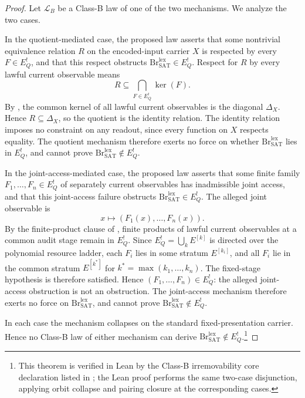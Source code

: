 \documentclass[11pt]{article}
\newcommand{\EQbang}{E^{!}_{Q}}
\theoremstyle{definition}
\begin{document}
\begin{proof}
Let \(\mathcal L_B\) be a Class-B law of one of the two mechanisms.
We analyze the two cases.

In the quotient-mediated case, the proposed law asserts that some
nontrivial equivalence relation \(R\) on the encoded-input carrier
\(X\) is respected by every \(F\in\EQbang\), and that this respect
obstructs
\(\mathrm{Br}^{\mathrm{lex}}_{\mathrm{SAT}}\in\EQbang\).  Respect for
\(R\) by every lawful current observable means
\[
  R\subseteq \bigcap_{F\in\EQbang}\ker(F).
\]
By , the common kernel of all lawful
current observables is the diagonal \(\Delta_X\).  Hence
\(R\subseteq\Delta_X\), so the quotient is the identity relation.  The
identity relation imposes no constraint on any readout, since every
function on \(X\) respects equality.  The quotient mechanism therefore
exerts no force on whether
\(\mathrm{Br}^{\mathrm{lex}}_{\mathrm{SAT}}\) lies in \(\EQbang\), and
cannot prove
\(\mathrm{Br}^{\mathrm{lex}}_{\mathrm{SAT}}\notin\EQbang\).

In the joint-access-mediated case, the proposed law asserts that some
finite family \(F_1,\ldots,F_n\in\EQbang\) of separately current
observables has inadmissible joint access, and that this joint-access
failure obstructs
\(\mathrm{Br}^{\mathrm{lex}}_{\mathrm{SAT}}\in\EQbang\).  The alleged
joint observable is
\[
  x\longmapsto (F_1(x),\ldots,F_n(x)).
\]
By the finite-product clause of
, finite products of lawful
current observables at a common audit stage remain in \(\EQbang\).
Since \(\EQbang=\bigcup_k E^{[k]}\) is directed over the polynomial
resource ladder, each \(F_i\) lies in some stratum \(E^{[k_i]}\), and
all \(F_i\) lie in the common stratum \(E^{[k^*]}\) for
\(k^*=\max(k_1,\ldots,k_n)\).  The fixed-stage hypothesis is therefore
satisfied.  Hence \((F_1,\ldots,F_n)\in\EQbang\): the alleged
joint-access obstruction is not an obstruction.  The joint-access
mechanism therefore exerts no force on
\(\mathrm{Br}^{\mathrm{lex}}_{\mathrm{SAT}}\), and cannot prove
\(\mathrm{Br}^{\mathrm{lex}}_{\mathrm{SAT}}\notin\EQbang\).

In each case the mechanism collapses on the standard
fixed-presentation carrier.  Hence no Class-B law of either mechanism
can derive
\(\mathrm{Br}^{\mathrm{lex}}_{\mathrm{SAT}}\notin\EQbang\).\footnote{This
theorem is verified in Lean by
the Class-B irremovability core declaration listed in
; the Lean proof performs the same two-case
disjunction, applying orbit collapse and pairing closure at the
corresponding cases.}
\end{proof}
\end{document}
